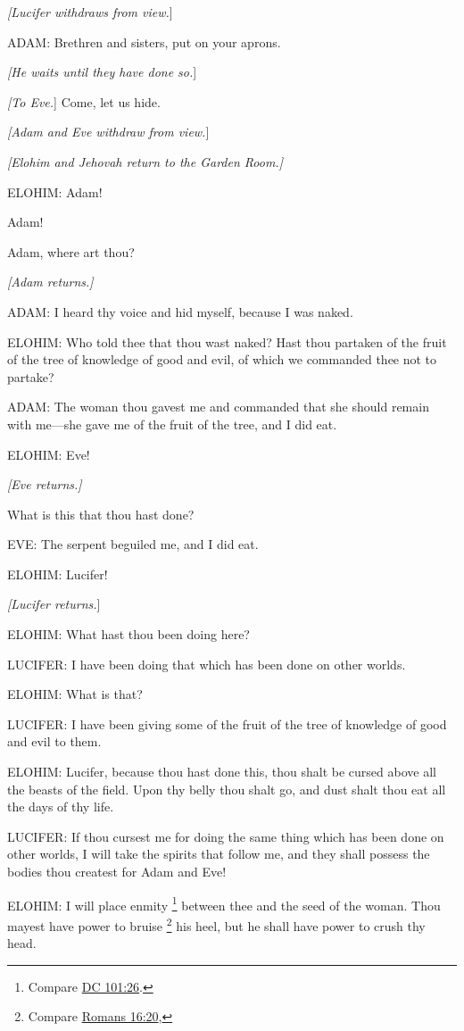 			\textit{[Lucifer withdraws from view.}]

			ADAM: Brethren and sisters, put on your aprons.

			\textit{[He waits until they have done so.}]

			\textit{[To Eve.}] Come, let us hide.

			\textit{[Adam and Eve withdraw from view.}]
			
			\textit{[Elohim and Jehovah return to the Garden Room.]}

			ELOHIM: Adam!

			Adam!

			Adam, where art thou?

			\textit{[Adam returns.]}

			ADAM: I heard thy voice and hid myself, because I was naked.

			ELOHIM: Who told thee that thou wast naked? Hast thou partaken of the fruit of the tree of knowledge of good and evil, of which we commanded thee not to partake?

			ADAM: The woman thou gavest me and commanded that she should remain with me---she gave me of the fruit of the tree, and I did eat.

			ELOHIM: Eve!

			\textit{[Eve returns.]}

			What is this that thou hast done?

			EVE: The serpent beguiled me, and I did eat.
			
			ELOHIM: Lucifer!

			\textit{[Lucifer returns.}]

			ELOHIM: What hast thou been doing here?

			LUCIFER: I have been doing that which has been done on other worlds.

			ELOHIM: What is that?

			LUCIFER: I have been giving some of the fruit of the tree of knowledge of good and evil to them.

			ELOHIM: Lucifer, because thou hast done this, thou shalt be cursed above all the beasts of the field. Upon thy belly thou shalt go, and dust shalt thou eat all the days of thy life.

			LUCIFER: If thou cursest me for doing the same thing which has been done on other worlds, I will take the spirits that follow me, and they shall possess the bodies thou createst for Adam and Eve!

			ELOHIM: I will place enmity%
				\footnote{%
					Compare \hyperref[DC101-26]{DC 101:26}.
					}
			between thee and the seed of the woman. Thou mayest have power to bruise%
			\footnote{%
				Compare \hyperref[ROMANS-16-20]{Romans 16:20}, 
				}
			his heel, but he shall have power to crush thy head.

